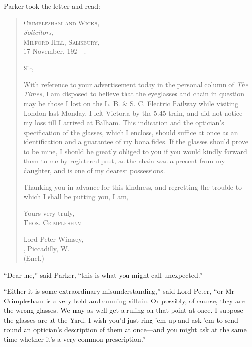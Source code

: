 Parker took the letter and read:
\begin{quotation}
\begin{flushright}
\hfill
\begin{minipage}{0.6\linewidth}
\textsc{Crimplesham and Wicks,}\\
\vin \textit{Solicitors,}\\
\textsc{Milford Hill, Salisbury,}\\
17 November, 192---.
\end{minipage}
\end{flushright}

\noindent Sir,

With reference to your advertisement today in the personal column of \textit{The Times}, I am disposed to believe that the eyeglasses and chain in question may be those I lost on the L. B. \& S. C. Electric Railway while visiting London last Monday. I left Victoria by the 5.45 train, and did not notice my loss till I arrived at Balham. This indication and the optician’s specification of the glasses, which I enclose, should suffice at once as an identification and a guarantee of my bona fides. If the glasses should prove to be mine, I should be greatly obliged to you if you would kindly forward them to me by registered post, as the chain was a present from my daughter, and is one of my dearest possessions.

Thanking you in advance for this kindness, and regretting the trouble to which I shall be putting you, I am,

\begin{flushright}
Yours very truly,\\
\textsc{Thos. Crimplesham}\\
\end{flushright}

\noindent Lord Peter Wimsey,\\
, Piccadilly, W.\\
\noindent (Encl.)
\end{quotation}

\enquote{Dear me,} said Parker, \enquote{this is what you might call unexpected.}

\enquote{Either it is some extraordinary misunderstanding,} said Lord Peter, \enquote{or Mr Crimplesham is a very bold and cunning villain. Or possibly, of course, they are the wrong glasses. We may as well get a ruling on that point at once. I suppose the glasses are at the Yard. I wish you’d just ring ’em up and ask ’em to send round an optician’s description of them at once\allowbreak---\allowbreak and you might ask at the same time whether it’s a very common prescription.}

